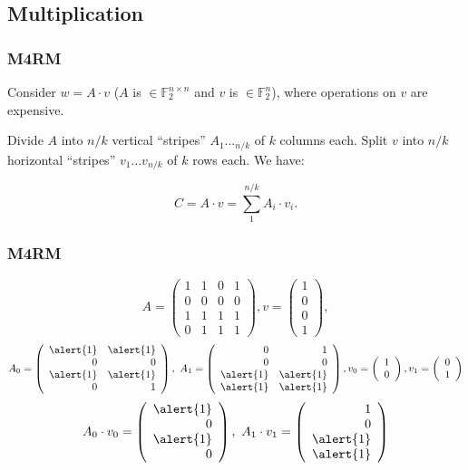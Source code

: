 \documentclass[10pt,compress]{beamer}
\newcommand{\F}{\mathbb{F}}
\begin{document}
\subsection{Multiplication}

\begin{frame}[fragile]
\frametitle{M4RM}
Consider $w = A \cdot v$ ($A$ is $\in \F_2^{n \times n}$ and $v$ is $\in \F_2^{n}$), where operations on $v$ are expensive.
\vspace{0.2cm}

Divide $A$ into $n/k$ vertical ``stripes'' $A_1 \dots _{n/k}$ of
$k$ columns each. Split $v$ into $n/k$ horizontal ``stripes'' $v_1 \dots v_{n/k}$ of $k$ rows each. We have:

\[
C = A \cdot v = \sum_1^{n/k} A_i \cdot v_i. 
\]
\end{frame}

\begin{frame}[fragile]
\frametitle{M4RM}
\begin{small}
$$A = \left(\begin{array}{rrrr}
1 & 1 & 0 & 1 \\
0 & 0 & 0 & 0 \\
1 & 1 & 1 & 1 \\
0 & 1 & 1 & 1
\end{array}\right), v = \left(\begin{array}{r}
1\\
0\\
0\\
1\end{array}\right),$$
$$A_0 = \left(\begin{array}{rr}
\alert{1} & \alert{1} \\
0 & 0 \\
\alert{1} & \alert{1} \\
0 & 1
\end{array}\right),\ 
A_1 = \left(\begin{array}{rr}
0 & 1 \\
0 & 0 \\
\alert{1} & \alert{1} \\
\alert{1} & \alert{1}
\end{array}\right), v_0 = \left(\begin{array}{rrrr}
1 \\
0
\end{array}\right), v_1 = \left(\begin{array}{rrrr}
0 \\
1
\end{array}\right)
$$
$$
A_0 \cdot v_0 = \left(\begin{array}{rrrr}
\alert{1}\\
0\\
\alert{1} \\
0
\end{array}\right),\ A_1 \cdot v_1 = \left(\begin{array}{rrrr}
1\\
0 \\
\alert{1}\\
\alert{1}
\end{array}\right)$$
\end{small}
\end{frame}
\end{document}
